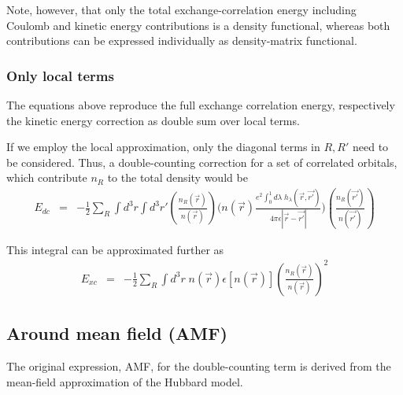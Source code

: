 \documentclass[11pt,a4paper]{report}
\begin{document}
Note, however, that only the total exchange-correlation energy
including Coulomb and kinetic energy contributions is a density
functional, whereas both contributions can be expressed individually
as density-matrix functional.

\subsubsection{Only local terms}
The equations above reproduce the full exchange correlation energy,
respectively the kinetic energy correction as double sum over local
terms.

If we employ the local approximation, only the diagonal terms in
$R,R'$ need to be considered. Thus, a double-counting correction for a
set of correlated orbitals, which contribute $n_R$ to the total
density would be
\begin{eqnarray}
E_{dc}
&=&-\frac{1}{2}\sum_{R}\int d^3r\int d^3r'
\left(\frac{n_R(\vec{r})}{n(\vec{r})}\right)
\biggl(
n(\vec{r})
\frac{e^2 \int_0^1d\lambda\;h_\lambda (\vec{r},\vec{r'})}
{4\pi\epsilon|\vec{r}-\vec{r'}|}\biggr)
\left(\frac{n_{R}(\vec{r'})}{n(\vec{r'})}\right)
\end{eqnarray}


This integral can be approximated further as
\begin{eqnarray}
E_{xc}
&=&-\frac{1}{2}\sum_{R}\int d^3r\; n(\vec{r})\epsilon[n(\vec{r})]
\left(\frac{n_R(\vec{r})}{n(\vec{r})}\right)^2
\end{eqnarray}


\subsection{Around mean field (AMF)}
The original expression, AMF, for the double-counting term is derived
from the mean-field approximation of the Hubbard model.
\end{document}
